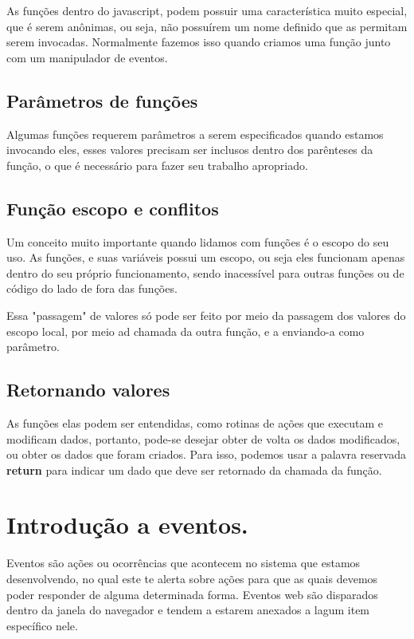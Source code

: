\documentclass[12pt, a4paper]{paper}
\begin{document}
As funções dentro do javascript, podem possuir uma característica muito especial, que 
é serem anônimas, ou seja, não possuírem um nome definido que as permitam serem 
invocadas. Normalmente fazemos isso quando criamos uma função junto com um 
manipulador de eventos.

\subsection{Parâmetros de funções} %
\label{sub:Parâmetros de funções}
Algumas funções requerem parâmetros a serem especificados quando estamos invocando eles,
 esses valores precisam ser inclusos dentro dos parênteses da função, o que é  
 necessário para fazer seu trabalho apropriado. 

\subsection{Função escopo e conflitos} %
\label{sub:Função escopo e conflitos}
Um conceito muito importante quando lidamos com funções é o escopo do seu uso. As 
funções, e suas variáveis possui um escopo, ou seja eles funcionam apenas dentro do 
seu próprio funcionamento, sendo inacessível para outras funções ou de código do lado 
de fora das funções. 

Essa "passagem" de valores só pode ser feito por meio da passagem dos valores do 
escopo local, por meio ad chamada da outra função, e a enviando-a como parâmetro.

\subsection{Retornando valores} %
\label{sub:Retornando valores}
As funções elas podem ser entendidas, como rotinas de ações que executam e modificam
dados, portanto, pode-se desejar obter de volta os dados modificados, ou obter os 
dados que foram criados. Para isso, podemos usar a palavra reservada \textbf{return} 
para indicar um dado que deve ser retornado da chamada da função.

\section{Introdução a eventos.} %
\label{sec:Introdução a eventos.}
Eventos são ações ou ocorrências que acontecem no sistema que estamos desenvolvendo, no 
qual este te alerta sobre ações para que as quais devemos poder responder de alguma 
determinada forma. Eventos web são disparados dentro da janela do navegador e tendem a 
estarem anexados a lagum item específico nele. 
\end{document}
